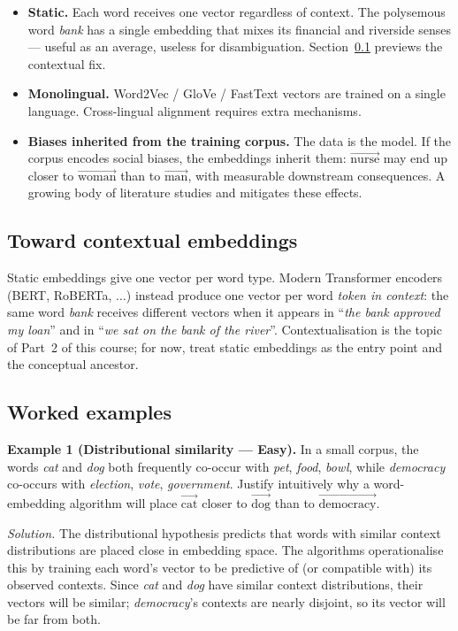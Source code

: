 \documentclass[12pt,a4paper]{report}
\theoremstyle{definition}
\theoremstyle{remark}
\begin{document}
\begin{itemize}
    \item \textbf{Static.} Each word receives one vector regardless of context. The polysemous word \emph{bank} has a single embedding that mixes its financial and riverside senses --- useful as an average, useless for disambiguation. Section~\ref{sec:contextual-preview} previews the contextual fix.
    \item \textbf{Monolingual.} Word2Vec / GloVe / FastText vectors are trained on a single language. Cross-lingual alignment requires extra mechanisms.
    \item \textbf{Biases inherited from the training corpus.} The data is the model. If the corpus encodes social biases, the embeddings inherit them: $\overrightarrow{\text{nurse}}$ may end up closer to $\overrightarrow{\text{woman}}$ than to $\overrightarrow{\text{man}}$, with measurable downstream consequences. A growing body of literature studies and mitigates these effects.
\end{itemize}

\subsection{Toward contextual embeddings}
\label{sec:contextual-preview}

Static embeddings give one vector per word type. Modern Transformer encoders (BERT, RoBERTa, $\dots$) instead produce one vector per word \emph{token in context}: the same word \emph{bank} receives different vectors when it appears in ``\emph{the bank approved my loan}'' and in ``\emph{we sat on the bank of the river}''. Contextualisation is the topic of Part~2 of this course; for now, treat static embeddings as the entry point and the conceptual ancestor.

\subsection{Worked examples}

\textbf{Example 1 (Distributional similarity --- Easy).}
In a small corpus, the words \emph{cat} and \emph{dog} both frequently co-occur with \emph{pet}, \emph{food}, \emph{bowl}, while \emph{democracy} co-occurs with \emph{election}, \emph{vote}, \emph{government}. Justify intuitively why a word-embedding algorithm will place $\overrightarrow{\text{cat}}$ closer to $\overrightarrow{\text{dog}}$ than to $\overrightarrow{\text{democracy}}$.

\textit{Solution.} The distributional hypothesis predicts that words with similar context distributions are placed close in embedding space. The algorithms operationalise this by training each word's vector to be predictive of (or compatible with) its observed contexts. Since \emph{cat} and \emph{dog} have similar context distributions, their vectors will be similar; \emph{democracy}'s contexts are nearly disjoint, so its vector will be far from both.
\end{document}
